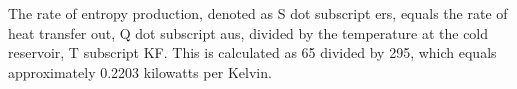 The rate of entropy production, denoted as S dot subscript ers, equals the rate of heat transfer out, Q dot subscript aus, divided by the temperature at the cold reservoir, T subscript KF. This is calculated as 65 divided by 295, which equals approximately 0.2203 kilowatts per Kelvin.